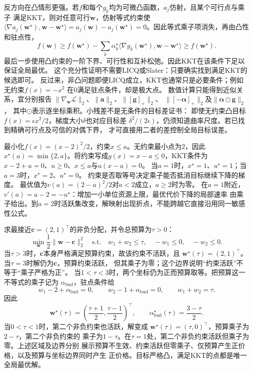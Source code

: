 反方向在凸情形更强。若$f$和每个$g_k$均为可微凸函数，$a_j$仿射，且某个可行点与乘子
满足KKT，则对任意可行$\bm{w}$，仿射等式约束使
$\langle\nabla a_j(\bm{w}^{\star}),\bm{w}-\bm{w}^{\star}\rangle
=a_j(\bm{w})-a_j(\bm{w}^{\star})=0$。因此等式乘子项消失，再由凸性和驻点性，
\[
  f(\bm{w})\geq
  f(\bm{w}^{\star})
  -\sum_k\alpha_k^{\star}
  \langle\nabla g_k(\bm{w}^{\star}),\bm{w}-\bm{w}^{\star}\rangle
  \geq f(\bm{w}^{\star}).
\]
最后一步使用凸约束的一阶下界、可行性和互补松弛。因此KKT在该条件下足以保证全局最优。
这个充分性证明不需要LICQ或Slater：只要确实找到满足KKT的候选即可。
反过来，非凸问题即便LICQ成立，KKT也通常只是必要条件；例如无约束$f(x)=-x^2$
在$0$满足驻点条件，却是极大点。
数值计算只能得到近似关系，宜分别报告
$\|\nabla_{\bm w}\mathcal L\|_2$、$\|\bm a\|_2$、$\|[\bm g]_+\|_2$、
$\|[-\bm\alpha]_+\|_2$及$\|\bm\alpha\odot\bm g\|_2$，
其中$\odot$表示逐坐标乘积。小残差不是无条件的目标差证书：
即使无约束凸目标$f(x)=\epsilon x^2/2$，梯度大小$\delta$也对应目标差
$\delta^2/(2\epsilon)$，仍须知道曲率尺度。若已找到精确可行点及可信的对偶下界，
才可直接用二者的差控制全局目标误差。

\begin{example}[活跃约束与乘子]
\label{ex:opt-scalar-active-constraint}
最小化$f(x)=(x-2)^2/2$，约束$x\leq a$。无约束最小点为$2$，因此
$x^\star(a)=\min\{2,a\}$。将约束写成$g(x)=x-a\leq0$，KKT条件为
$x-2+u=0$、$u\geq0$、$x\leq a$与$u(x-a)=0$。
当$a=1$时，$x^\star=1$、$u^\star=1$；当$a=3$时，$x^\star=2$、$u^\star=0$。
约束是否取等号决定乘子能否抵消目标继续下降的梯度。
最优值为$v(a)=(2-a)^2/2$对$a<2$成立，$a\geq2$时为零。
在$a=1$附近，$v'(a)=a-2=-u^\star$：增加一小单位资源上限，最优代价下降的局部速率
由乘子给出。到$a=2$时活跃集改变，解映射出现折点，不能跨越它直接沿用同一敏感性公式。
\end{example}

\begin{example}
\label{ex:opt-kkt-budget}
求最接近$\bm{c}=(2,1)^{\top}$的非负分配，并令总预算为$\tau>0$：
\[
  \min_{\bm{w}}\frac12\lVert\bm{w}-\bm{c}\rVert_2^2
  \quad\text{s.t.}\quad
  w_1+w_2\leq\tau,\quad -w_1\leq0,\quad -w_2\leq0.
\]
当$\tau>3$时，$\bm{c}$本身严格满足预算约束，故该约束不活跃，且
$\bm{w}^{\star}(\tau)=(2,1)^{\top}$。当$\tau=3$时解仍为$\bm{c}$，预算约束活跃，
但其乘子为零；这个边界说明“约束活跃”不等于“乘子严格为正”。
当$1<\tau<3$时，两个坐标仍为正而预算取等。把预算这一不等式的乘子记为
$\alpha_{\mathrm{bud}}$，驻点条件给
\[
  w_1-2+\alpha_{\mathrm{bud}}=0,\qquad
  w_2-1+\alpha_{\mathrm{bud}}=0,\qquad
  w_1+w_2=\tau.
\]
因此
\[
  \bm{w}^{\star}(\tau)
  =\left(\frac{\tau+1}{2},\frac{\tau-1}{2}\right)^{\top},
  \qquad
  \alpha_{\mathrm{bud}}^{\star}(\tau)=\frac{3-\tau}{2}.
\]
当$0<\tau<1$时，第二个非负约束也活跃，解变成
$\bm{w}^{\star}(\tau)=(\tau,0)^{\top}$，预算乘子为$2-\tau$，第二个非负约束的
乘子为$1-\tau$。在$\tau=1$处，第二个非负约束活跃但乘子为零。上述区域及边界分别
展示预算不生效、约束活跃但零乘子、仅预算产生正价格，以及预算与坐标边界同时产生
正价格。目标严格凸，满足KKT的点都是唯一全局最优解。
\end{example}

